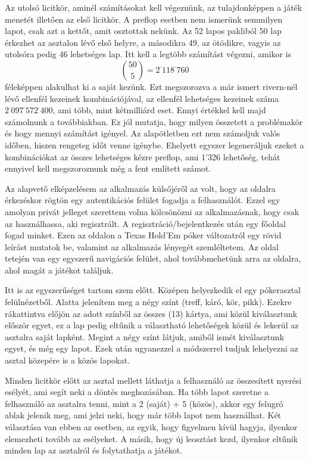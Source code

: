 Az utolsó licitkör, aminél számításokat kell végeznünk, az tulajdonképpen a játék menetét illetően az első licitkör. A preflop esetben nem ismerünk semmilyen lapot, csak azt a kettőt, amit osztottak nekünk. Az 52 lapos pakliból 50 lap érkezhet az asztalon lévő első helyre, a másodikra 49, az ötödikre, vagyis az utolsóra pedig 46 lehetséges lap. Itt kell a legtöbb számítást végezni, amikor is \[ \binom{50}{5}=2^{\cdot}118^{\cdot}760\] féleképpen alakulhat ki a saját kezünk. Ezt megszorozva a már ismert rivern-nél lévő ellenfél kezeinek kombinációjával, az ellenfél lehetséges kezeinek száma\linebreak $2^{\cdot}097^{\cdot}572^{\cdot}400$, ami több, mint kétmilliárd eset. Ennyi értékkel kell majd számolnunk a továbbiakban. Ez jól mutatja, hogy milyen összetett a problémakör és hogy mennyi számítást igényel. Az alapötletben ezt nem számoljuk valós időben, hiszen rengeteg időt venne igénybe. Ehelyett egyszer legeneráljuk ezeket a kombinációkat az összes lehetséges kézre preflop, ami 1'326 lehetőség, tehát ennyivel kell megszoroznunk még a fent említett számot.


Az alapvető elképzelésem az alkalmazás külsőjéről az volt, hogy az oldalra érkezéskor rögtön egy autentikációs felület fogadja a felhasználót. Ezzel egy amolyan privát jelleget szerettem volna kölcsönözni az alkalmazásnak, hogy csak az használhassa, aki regisztrált. A regisztráció/bejelentkezés után egy főoldal fogad minket. Ezen az oldalon a Texas Hold'Em póker változatról egy rövid leírást mutatok be, valamint az alkalmazás lényegét szemléltetem. Az oldal tetején van egy egyszerű navigációs felület, ahol továbbmehetünk arra az oldalra, ahol magát a játékot találjuk.

Itt is az egyszerűséget tartom szem előtt. Középen helyezkedik el egy pókerasztal felülnézetből. Alatta jelenítem meg a négy színt (treff, káró, kör, pikk). Ezekre rákattintva előjön az adott színből az összes (13) kártya, ami közül kiválasztunk először egyet, ez a lap pedig eltűnik a választható lehetőségek közül és lekerül az asztalra saját lapként. Megint a négy színt látjuk, amiből ismét kiválasztunk egyet, és még egy lapot. Ezek után ugyanezzel a módszerrel tudjuk lehelyezni az asztal közepére is a közös lapokat.

Minden licitkör előtt az asztal mellett láthatja a felhasználó az összesített nyerési esélyét, ami segít neki a döntés meghozásában. Ha több lapot szeretne a felhasználó az asztalra tenni, mint a 2 (saját) + 5 (közös), akkor egy felugró ablak jelenik meg, ami jelzi neki, hogy már több lapot nem használhat. Két választása van ebben az esetben, az egyik, hogy figyelmen kívül hagyja, ilyenkor elemezheti tovább az esélyeket. A másik, hogy új leosztást kezd, ilyenkor eltűnik minden lap az asztalról és folytathatja a játékot.

